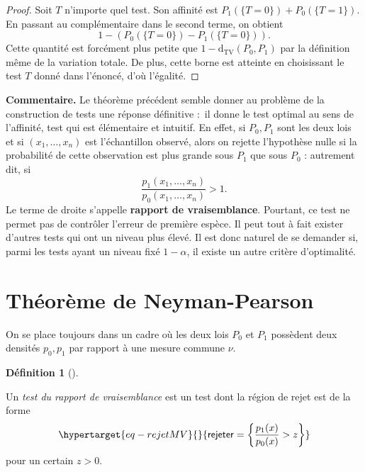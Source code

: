\documentclass[
  10,
  letterpaper,
  DIV=11,
  numbers=noendperiod]{scrreport}
\newcommand{\dtv}{\mathrm{d}_{\mathrm{TV}}}
\theoremstyle{plain}
\theoremstyle{definition}
\theoremstyle{plain}
\theoremstyle{definition}
\newtheorem{definition}{Définition}[chapter]
\theoremstyle{definition}
\theoremstyle{plain}
\theoremstyle{remark}
\begin{document}
\begin{proof}

Soit \(T\) n'importe quel test. Son affinité est
\(P_1(\{T=0\}) + P_0(\{T=1\})\). En passant au complémentaire dans le
second terme, on obtient \[1 - (P_0(\{T=0\}) - P_1(\{T=0\})). \] Cette
quantité est forcément plus petite que \(1 - \dtv(P_0, P_1)\) par la
définition même de la variation totale. De plus, cette borne est
atteinte en choisissant le test \(T\) donné dans l'énoncé, d'où
l'égalité.

\end{proof}

\textbf{Commentaire.} Le théorème précédent semble donner au problème de
la construction de tests une réponse définitive :~il donne le test
optimal au sens de l'affinité, test qui est élémentaire et intuitif. En
effet, si \(P_0, P_1\) sont les deux lois et si \((x_1, \dotsc, x_n)\)
est l'échantillon observé, alors on rejette l'hypothèse nulle si la
probabilité de cette observation est plus grande sous \(P_1\) que sous
\(P_0\) : autrement dit, si
\[ \frac{p_1(x_1, \dotsc, x_n)}{p_0(x_1, \dotsc, x_n)}>1. \] Le terme de
droite s'appelle \textbf{rapport de vraisemblance}. Pourtant, ce test ne
permet pas de contrôler l'erreur de première espèce. Il peut tout à fait
exister d'autres tests qui ont un niveau plus élevé. Il est donc naturel
de se demander si, parmi les tests ayant un niveau fixé \(1-\alpha\), il
existe un autre critère d'optimalité.

\hypertarget{thuxe9oruxe8me-de-neyman-pearson}{%
\section{Théorème de
Neyman-Pearson}\label{thuxe9oruxe8me-de-neyman-pearson}}

On se place toujours dans un cadre où les deux lois \(P_0\) et \(P_1\)
possèdent deux densités \(p_0, p_1\) par rapport à une mesure commune
\(\nu\).

\begin{definition}[]\protect\hypertarget{def-testRV}{}\label{def-testRV}

Un \emph{test du rapport de vraisemblance} est un test dont la région de
rejet est de la forme
\begin{equation}\protect\hypertarget{eq-rejetMV}{}{\mathsf{rejeter}= \left\lbrace \frac{p_1(x)}{p_0(x)} > z \right\rbrace }\label{eq-rejetMV}\end{equation}
pour un certain \(z>0\).

\end{definition}
\end{document}
